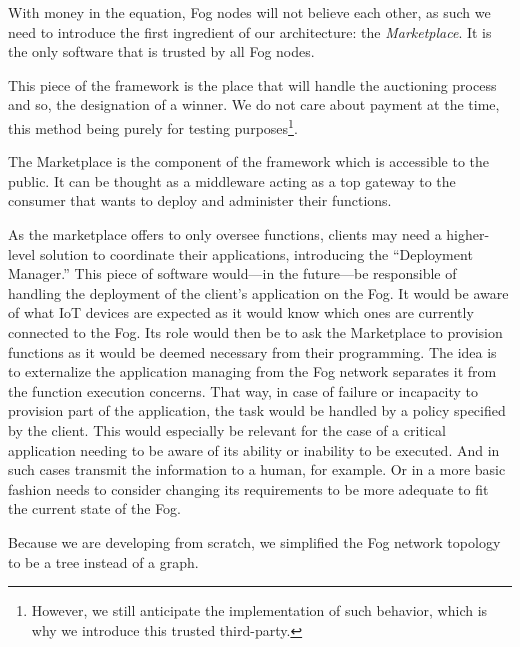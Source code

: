 With money in the equation, Fog nodes will not believe each other, as such we need to introduce the first ingredient of our architecture: the \emph{Marketplace}. It is the only software that is trusted by all Fog nodes.

This piece of the framework is the place that will handle the auctioning process and so, the designation of a winner. We do not care about payment at the time, this method being purely for testing purposes\footnote{However, we still anticipate the implementation of such behavior, which is why we introduce this trusted third-party.}.

The Marketplace is the component of the framework which is accessible to the public. It can be thought as a middleware acting as a top gateway to the consumer that wants to deploy and administer their functions.

As the marketplace offers to only oversee functions, clients may need a higher-level solution to coordinate their applications, introducing the “Deployment Manager.” This piece of software would—in the future—be responsible of handling the deployment of the client's application on the Fog. It would be aware of what \gls{IoT} devices are expected as it would know which ones are currently connected to the Fog. Its role would then be to ask the Marketplace to provision functions as it would be deemed necessary from their programming. The idea is to externalize the application managing from the Fog network separates it from the function execution concerns. That way, in case of failure or incapacity to provision part of the application, the task would be handled by a policy specified by the client. This would especially be relevant for the case of a critical application needing to be aware of its ability or inability to be executed. And in such cases transmit the information to a human, for example. Or in a more basic fashion needs to consider changing its requirements to be more adequate to fit the current state of the Fog.

Because we are developing from scratch, we simplified the Fog network topology to be a tree instead of a graph.

